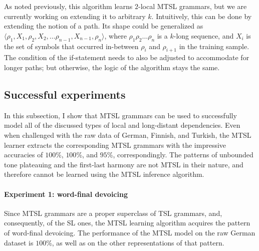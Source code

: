 As noted previously, this algorithm learns $2$-local MTSL grammars, but we are currently working on extending it to arbitrary $k$.
Intuitively, this can be done by extending the notion of a path.
Its shape could be generalized as $\langle\rho_1, X_1, \rho_2, X_2, \dots \rho_{n-1}, X_{n-1}, \rho_n\rangle$, where $\rho_1\rho_2\dots\rho_n$ is a $k$-long sequence, and $X_i$ is the set of symbols that occurred in-between $\rho_i$ and $\rho_{i+1}$ in the training sample.
The condition of the if-statement needs to also be adjusted to accommodate for longer paths; but otherwise, the logic of the algorithm stays the same.



\subsection{Successful experiments}

In this subsection, I show that MTSL grammars can be used to successfully model all of the discussed types of local and long-distant dependencies.
Even when challenged with the raw data of German, Finnish, and Turkish, the MTSL learner extracts the corresponding MTSL grammars with the impressive accuracies of $100$\%, $100$\%, and $95$\%, correspondingly.
The patterns of unbounded tone plateauing and the first-last harmony are not MTSL in their nature, and therefore cannot be learned using the MTSL inference algorithm.


\paragraph{Experiment 1: word-final devoicing}

Since MTSL grammars are a proper superclass of TSL grammars, and, consequently, of the SL ones, the MTSL learning algorithm acquires the pattern of word-final devoicing.
The performance of the MTSL model on the raw German dataset is $100$\%, as well as on the other representations of that pattern.

\begin{table}[h!]
\centering
{}
\caption{MTSL learning of the word-final devoicing; raw representation.}
\end{table}


